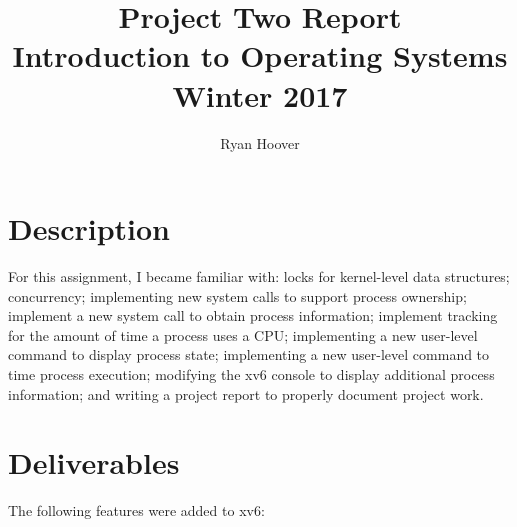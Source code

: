 \documentclass[11pt,letterpaper]{report}
\author{Ryan Hoover}
\title{Project Two Report\\Introduction to Operating Systems\\ Winter 2017}
\date{}
\begin{document}

	\section*{Description}
	For this assignment, I became familiar with: locks for kernel-level data structures; concurrency; implementing new system calls to support process ownership; implement a new system call to obtain process information; implement tracking for the amount of time a process uses a CPU; implementing a new user-level command to display process state; implementing a new user-level command to time process execution; modifying the xv6 console to display additional process information; and writing a project report to properly document project work.\\
	
	\section*{Deliverables}
	The following features were added to xv6:
	
\end{document}

